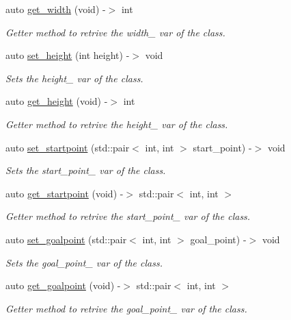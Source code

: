\begin{DoxyCompactItemize}
auto \hyperlink{class_bfs_aabc02f36ad832553dcc0c7a59f4ba33f}{get\+\_\+width} (void) -\/$>$ int
\begin{DoxyCompactList}\small\item\em Getter method to retrive the width\+\_\+ var of the class. \end{DoxyCompactList}\item 
auto \hyperlink{class_bfs_afe4ec025381a484e7e44c00eefd344a5}{set\+\_\+height} (int height) -\/$>$ void
\begin{DoxyCompactList}\small\item\em Sets the height\+\_\+ var of the class. \end{DoxyCompactList}\item 
auto \hyperlink{class_bfs_ae982ad85510c5a58d8f7ae0dcd7ca0b7}{get\+\_\+height} (void) -\/$>$ int
\begin{DoxyCompactList}\small\item\em Getter method to retrive the height\+\_\+ var of the class. \end{DoxyCompactList}\item 
auto \hyperlink{class_bfs_aa593e45070cc4a6b2da2033db2807dba}{set\+\_\+startpoint} (std\+::pair$<$ int, int $>$ start\+\_\+point) -\/$>$ void
\begin{DoxyCompactList}\small\item\em Sets the start\+\_\+point\+\_\+ var of the class. \end{DoxyCompactList}\item 
auto \hyperlink{class_bfs_a2135a092516b1a479fcb0ab2c29d7c6b}{get\+\_\+startpoint} (void) -\/$>$ std\+::pair$<$ int, int $>$
\begin{DoxyCompactList}\small\item\em Getter method to retrive the start\+\_\+point\+\_\+ var of the class. \end{DoxyCompactList}\item 
auto \hyperlink{class_bfs_ac95348ae1a98455f6e653d3ce1c7d3ae}{set\+\_\+goalpoint} (std\+::pair$<$ int, int $>$ goal\+\_\+point) -\/$>$ void
\begin{DoxyCompactList}\small\item\em Sets the goal\+\_\+point\+\_\+ var of the class. \end{DoxyCompactList}\item 
auto \hyperlink{class_bfs_adbe43c422422b5813a4865db18f79e52}{get\+\_\+goalpoint} (void) -\/$>$ std\+::pair$<$ int, int $>$
\begin{DoxyCompactList}\small\item\em Getter method to retrive the goal\+\_\+point\+\_\+ var of the class. \end{DoxyCompactList}\item 

\end{DoxyCompactItemize}
